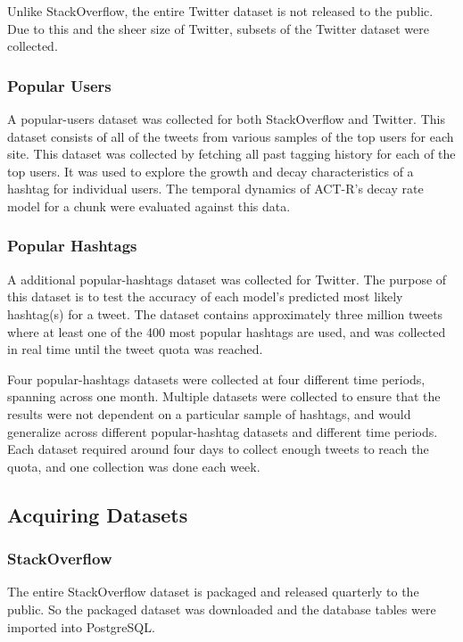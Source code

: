 \documentclass[man,floatsintext,donotrepeattitle]{apa6}
\begin{document}
Unlike StackOverflow, the entire Twitter dataset is not released to the public.
Due to this and the sheer size of Twitter, subsets of the Twitter dataset were collected.

\subsubsection{Popular Users}

A popular-users dataset was collected for both StackOverflow and Twitter.
This dataset consists of all of the tweets from various samples of the top users for each site.
This dataset was collected by fetching all past tagging history for each of the top users.
It was used to explore the growth and decay characteristics of a hashtag for individual users.
The temporal dynamics of ACT-R's decay rate model for a chunk were evaluated against this data.

\subsubsection{Popular Hashtags}

A additional popular-hashtags dataset was collected for Twitter.
The purpose of this dataset is to test the accuracy of each model's predicted most likely hashtag(s) for a tweet.
The dataset contains approximately three million tweets where at least one of the 400 most popular hashtags are used, and was collected in real time until the tweet quota was reached.

Four popular-hashtags datasets were collected at four different time periods, spanning across one month.
Multiple datasets were collected to ensure that the results were not dependent on a particular sample of hashtags, and would generalize across different popular-hashtag datasets and different time periods.
Each dataset required around four days to collect enough tweets to reach the quota, and one collection was done each week.

\subsection{Acquiring Datasets}

\subsubsection{StackOverflow}

The entire StackOverflow dataset is packaged and released quarterly to the public.
So the packaged dataset was downloaded and the database tables were imported into PostgreSQL.
\end{document}

